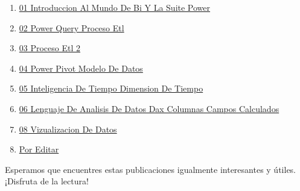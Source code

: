 \documentclass[
  jou,
  floatsintext,
  longtable,
  a4paper,
  nolmodern,
  notxfonts,
  notimes,
  colorlinks=true,linkcolor=blue,citecolor=blue,urlcolor=blue]{apa7}
\providecommand{\tightlist}{%
  \setlength{\itemsep}{0pt}\setlength{\parskip}{0pt}}
\begin{document}
\begin{enumerate}
\def\labelenumi{\arabic{enumi}.}
\tightlist
\item
  \href{https://achalmaedison.netlify.app/herramientas-oficina/power-bi/2022-09-12-01-introduccion-al-mundo-de-bi-y-la-suite-power/index.pdf}{}
  \href{https://achalmaedison.netlify.app/herramientas-oficina/power-bi/2022-09-12-01-introduccion-al-mundo-de-bi-y-la-suite-power}{01
  Introduccion Al Mundo De Bi Y La Suite Power}
\item
  \href{https://achalmaedison.netlify.app/herramientas-oficina/power-bi/2022-09-19-02-power-query-proceso-etl/index.pdf}{}
  \href{https://achalmaedison.netlify.app/herramientas-oficina/power-bi/2022-09-19-02-power-query-proceso-etl}{02
  Power Query Proceso Etl}
\item
  \href{https://achalmaedison.netlify.app/herramientas-oficina/power-bi/2022-09-26-03-proceso-etl-2/index.pdf}{}
  \href{https://achalmaedison.netlify.app/herramientas-oficina/power-bi/2022-09-26-03-proceso-etl-2}{03
  Proceso Etl 2}
\item
  \href{https://achalmaedison.netlify.app/herramientas-oficina/power-bi/2022-10-03-04-power-pivot-modelo-de-datos/index.pdf}{}
  \href{https://achalmaedison.netlify.app/herramientas-oficina/power-bi/2022-10-03-04-power-pivot-modelo-de-datos}{04
  Power Pivot Modelo De Datos}
\item
  \href{https://achalmaedison.netlify.app/herramientas-oficina/power-bi/2022-10-10-05-inteligencia-de-tiempo-dimension-de-tiempo/index.pdf}{}
  \href{https://achalmaedison.netlify.app/herramientas-oficina/power-bi/2022-10-10-05-inteligencia-de-tiempo-dimension-de-tiempo}{05
  Inteligencia De Tiempo Dimension De Tiempo}
\item
  \href{https://achalmaedison.netlify.app/herramientas-oficina/power-bi/2022-10-17-06-lenguaje-de-analisis-de-datos-dax-columnas-campos-calculados/index.pdf}{}
  \href{https://achalmaedison.netlify.app/herramientas-oficina/power-bi/2022-10-17-06-lenguaje-de-analisis-de-datos-dax-columnas-campos-calculados}{06
  Lenguaje De Analisis De Datos Dax Columnas Campos Calculados}
\item
  \href{https://achalmaedison.netlify.app/herramientas-oficina/power-bi/2022-10-24-08-vizualizacion-de-datos/index.pdf}{}
  \href{https://achalmaedison.netlify.app/herramientas-oficina/power-bi/2022-10-24-08-vizualizacion-de-datos}{08
  Vizualizacion De Datos}
\item
  \href{https://achalmaedison.netlify.app/herramientas-oficina/power-bi/2024-03-31-por-editar/index.pdf}{}
  \href{https://achalmaedison.netlify.app/herramientas-oficina/power-bi/2024-03-31-por-editar}{Por
  Editar}
\end{enumerate}

Esperamos que encuentres estas publicaciones igualmente interesantes y
útiles. ¡Disfruta de la lectura!
\end{document}
